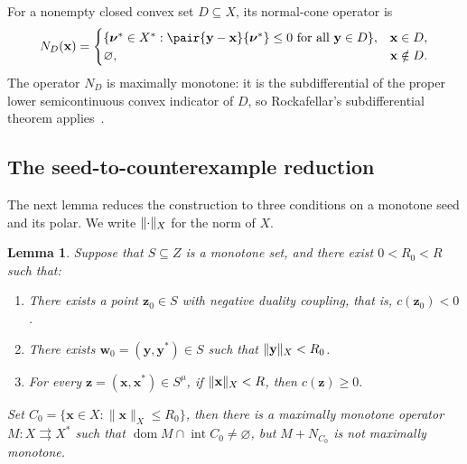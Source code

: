 \documentclass[11pt,a4paper]{article}
\theoremstyle{reportstyle}
\newtheorem{lemma}{Lemma}
\numberwithin{equation}{section}
\DeclareMathOperator{\dom}{dom}
\DeclareMathOperator{\Int}{int}
\newcommand{\bx}{\mathbf x}
\newcommand{\by}{\mathbf y}
\newcommand{\bz}{\mathbf z}
\newcommand{\bw}{\mathbf w}
\newcommand{\bnu}{\boldsymbol\nu}
\DeclarePairedDelimiter{\norm}{\lVert}{\rVert}
\begin{document}
	For a nonempty closed convex set $D\subseteq X$, its normal-cone operator is
	\begin{equation*}
		N_D(\bx)=
		\begin{cases}
			\{\bnu^*\in X^*: \pair{\by-\bx}{\bnu^*}\le0\ \text{for all }\by\in D\}, &\bx\in D,\\
			\varnothing,&\bx\notin D.
		\end{cases}
	\end{equation*}
	The operator $N_D$ is maximally monotone: it is the subdifferential of
	the proper lower semicontinuous convex indicator of $D$, so
	Rockafellar's subdifferential theorem applies~\cite{rockafellar1970subdifferential}.

	\subsection{The seed-to-counterexample reduction}
	The next lemma reduces the construction to three conditions on a
	monotone seed and its polar. We write $\norm{\cdot}_X$ for the norm of $X$.

	\begin{lemma}
		\label{lem:seed}
		Suppose that $S\subseteq Z$ is a monotone set, and there exist $0<R_0<R$ such that:
		\begin{enumerate}[label=(\roman*),ref=\roman*]
			\item \label{cond:negative}
			There exists a point $\bz_0\in S$ with negative duality coupling, that is, $c(\bz_0)<0$.
			\item \label{cond:interior}
			There exists $\bw_0=(\by,\by^*)\in S$ such that $\norm{\by}_X<R_0$.
			\item \label{cond:local}
			For every $\bz=(\bx,\bx^*)\in S^\mu$, if $\norm{\bx}_X<R$, then $c(\bz)\ge0.$
		\end{enumerate}
		Set $C_0=\{\bx\in X: \|\bx\|_X\leq R_0\}$, then there is a maximally monotone operator
		$M:X\rightrightarrows X^*$ such that $\dom M\cap\Int C_0\ne\varnothing$, but $M+N_{C_0}$ is not maximally monotone.
	\end{lemma}
\end{document}
